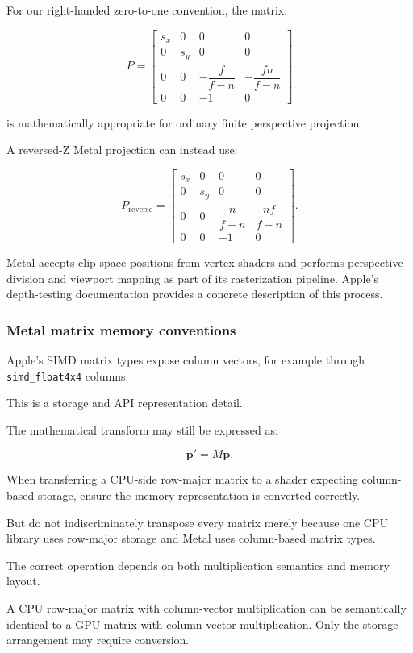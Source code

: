For our right-handed zero-to-one convention, the matrix:

\[
 P= \begin{bmatrix} s_x&0&0&0\\ 0&s_y&0&0\\ 0&0&-\dfrac f{f-n}&-\dfrac{fn}{f-n}\\ 0&0&-1&0 \end{bmatrix}
\]

is mathematically appropriate for ordinary finite perspective projection.

A reversed-Z Metal projection can instead use:

\[
 P_{\mathrm{reverse}}= \begin{bmatrix} s_x&0&0&0\\ 0&s_y&0&0\\ 0&0&\dfrac n{f-n}&\dfrac{nf}{f-n}\\ 0&0&-1&0 \end{bmatrix}.
\]

Metal accepts clip-space positions from vertex shaders and performs perspective division and viewport mapping as part of its rasterization pipeline. Apple's depth-testing documentation provides a concrete description of this process. 

\subsubsection{Metal matrix memory conventions}\label{metal-matrix-memory-conventions}

Apple's SIMD matrix types expose column vectors, for example through \texttt{simd\_float4x4} columns.

This is a storage and API representation detail.

The mathematical transform may still be expressed as:

\[
 \mathbf p'=M\mathbf p.
\]

When transferring a CPU-side row-major matrix to a shader expecting column-based storage, ensure the memory representation is converted correctly.

But do not indiscriminately transpose every matrix merely because one CPU library uses row-major storage and Metal uses column-based matrix types.

The correct operation depends on both multiplication semantics and memory layout.

A CPU row-major matrix with column-vector multiplication can be semantically identical to a GPU matrix with column-vector multiplication. Only the storage arrangement may require conversion.


